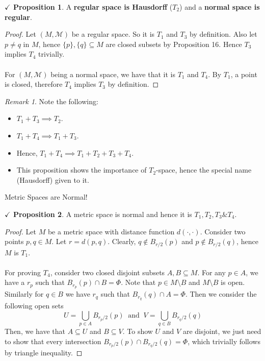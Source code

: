 \documentclass{article}
\newcommand{\notset}[0]{\setminus}
\theoremstyle{definition}
\theoremstyle{remark}
\newtheorem*{remark}{Remark}
\theoremstyle{definition}
\theoremstyle{definition}
\newtheorem{proposition}{$\checkmark$ Proposition}
\newcommand{\topo}[1]{\mathcal{#1}}
\newcommand{\intrs}[0]{\cap}
\newcommand{\bunion}[0]{\bigcup}
\begin{document}
\hrulefill
\newpage
\begin{proposition}
	A \textbf{regular space is Hausdorff} ($ T_2 $) and a \textbf{normal space is regular}.
\end{proposition}
\begin{proof}
	Let $ (M,\topo{M}) $ be a regular space. So it is $ T_1 $ and $ T_3 $ by definition. Also let $ p \neq q $ in $ M $, hence $ \{p\}, \{q\} \subseteq M $ are closed subsets by Proposition 16. Hence $ T_3 $ implies $ T_4 $ trivially.\\\\
	For $ (M,\topo{M}) $ being a normal space, we have that it is $ T_1 $ and $ T_4 $. By $ T_1 $, a point is closed, therefore $ T_4  $ implies $ T_3 $ by definition.
\end{proof}
\begin{remark} Note the following:
	\begin{itemize}
		\item{$ T_1 + T_3 \implies T_2 $.}
		\item{$ T_1 + T_4 \implies T_1 + T_3$.}
		\item{Hence, $ T_1 + T_4 \implies T_1 + T_2 + T_3 + T_4 $.}
		\item{This proposition shows the importance of $ T_2 $-space, hence the special name (Hausdorff) given to it.}
	\end{itemize}
\end{remark}
\hrulefill
Metric Spaces are Normal!
\hrulefill
\begin{proposition}
	A metric space is normal and hence it is $ T_1, T_2, T_3 \& T_4 $.
\end{proposition}
\begin{proof}
	Let $ M $ be a metric space with distance function $ d(\cdot,\cdot) $. Consider two points $ p,q\in M $. Let $ r = d(p,q) $. Clearly, $ q \notin B_{r/2}(p)  $ and $ p \notin B_{r/2}(q) $, hence $ M $ is $ T_1 $. \\\\
	For proving $ T_4 $, consider two closed disjoint subsets $ A,B \subseteq M $. For any $ p\in A $, we have a $ r_p $ such that $ B_{r_p}(p) \intrs B = \Phi $. Note that $ p\in M\notset B $ and $ M\notset B $ is open. Similarly for $ q \in B $ we have $ r_q $ such that $ B_{r_q}(q) \intrs A = \Phi $. Then we consider the following open sets
	\[U = \bunion_{p\in A} B_{r_p/2}(p) \;\;\text{and}\;\;V = \bunion_{q \in B}B_{r_q/2}(q)\]
	Then, we have that $ A \subseteq U $ and $ B \subseteq V $. To show $ U $ and $ V $ are disjoint, we just need to show that every intersection $ B_{r_p/2}(p) \intrs B_{r_q/2}(q) = \Phi $, which trivially follows by triangle inequality. 
\end{proof}
\end{document}
